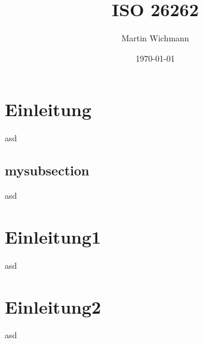 \documentclass[]{beamer}
\author{Martin Wichmann}
\title{ISO 26262}
\date{\today}
\institute{Ostfalia Hochschule für angewandte Wissenschaften}
\begin{document}
\begin{frame}
\maketitle
\end{frame}


\begin{frame}
\tableofcontents
\end{frame}





\section{Einleitung}
\label{sec:einleitung}

\begin{frame}
asd
\end{frame}



\subsection{mysubsection}

\begin{frame}
asd
\end{frame}






\section{Einleitung1}
\label{sec:einleitung1}

\begin{frame}
asd
\end{frame}









\section{Einleitung2}
\label{sec:einleitung2}

\begin{frame}
asd
\end{frame}
\end{document}
